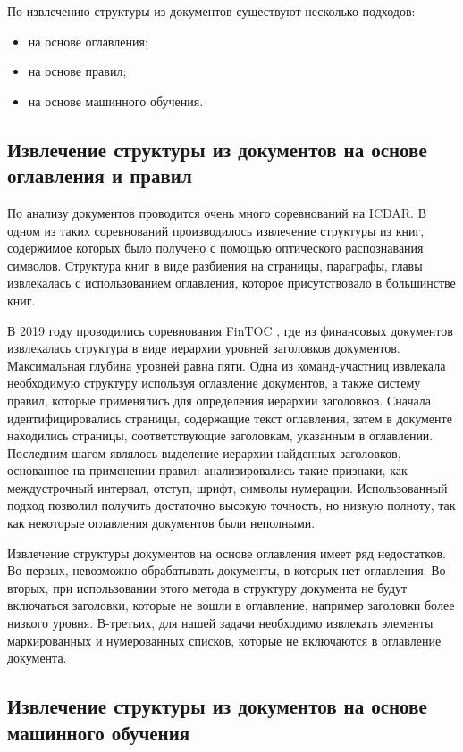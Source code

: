 \documentclass[a4paper,12pt]{article}
\begin{document}
По извлечению структуры из документов существуют несколько подходов:
\begin{itemize}
\item на основе оглавления;
\item на основе правил;
\item на основе машинного обучения.
\end{itemize}

\subsection{Извлечение структуры из документов на основе оглавления и правил}

По анализу документов проводится очень много соревнований на ICDAR. В одном из таких соревнований \cite{link1} производилось извлечение структуры из книг, содержимое которых было получено с помощью оптического распознавания символов. Структура книг в виде разбиения на страницы, параграфы, главы извлекалась с использованием оглавления, которое присутствовало в большинстве книг. 

В 2019 году проводились соревнования FinTOC \cite{link2}, где из финансовых документов извлекалась структура в виде иерархии уровней заголовков документов. Максимальная глубина уровней равна пяти. Одна из команд-участниц \cite{link3} извлекала необходимую структуру используя оглавление документов, а также систему правил, которые применялись для определения иерархии заголовков.
Сначала идентифицировались страницы, содержащие текст оглавления, затем в документе находились страницы, соответствующие заголовкам, указанным в оглавлении. 
Последним шагом являлось выделение иерархии найденных заголовков, основанное на применении правил: анализировались такие признаки, как междустрочный интервал, отступ, шрифт, символы нумерации.
Использованный подход позволил получить достаточно высокую точность, но низкую полноту, так как некоторые оглавления документов были неполными.

Извлечение структуры документов на основе оглавления имеет ряд недостатков. Во-первых, невозможно обрабатывать документы, в которых нет оглавления. Во-вторых, при использовании этого метода в структуру документа не будут включаться заголовки, которые не вошли в оглавление, например заголовки более низкого уровня. В-третьих, для нашей задачи необходимо извлекать элементы маркированных и нумерованных списков, которые не включаются в оглавление документа.

\subsection{Извлечение структуры из документов на основе машинного обучения}
\end{document}
